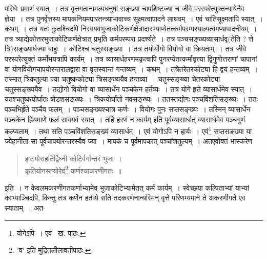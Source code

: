 \documentclass[11pt, openany]{book}
\begin{document}
\noindent परिधेः प्रमाणं स्यात्~। तत्र वृत्तगतानामल्पधनुषां सङ्ख्या चापशिष्टज्या च {\qt जीवे परस्परे}त्युक्तन्यायेनैव ज्ञेया~। तत्र पुनर्वृत्तस्य मापकनियमपारतन्त्र्याभावाच्च सूक्ष्मत्वापादने लाघवम्~। एवं चातिसूक्ष्मतापि स्यात्~। कथम्~। तत्र यतः कुतश्चिदपि
निरवयवभुजाकोटिकर्णक्षेत्रादारभ्याप्येतत्कर्मपरम्परयाल्पत्वमप्यापादनीयम्~। तत्र त्र्याद्येकोत्तरभुजाकोटिकर्णक्षेत्रात् प्रभृति कर्मपरम्परा प्रदर्श्यते~। तत्र पञ्चसङ्ख्यव्यासार्धवृ(तेति ? त्ते त्रि)सङ्ख्यार्धज्या बाहुः~। कोटिश्च चतुस्सङ्ख्या~। तत्र तयोर्योगो वियोगो वा क्रियताम्~। तत्र {\qt जीवे परस्परे}त्युक्तं कर्मोभयत्रापि कार्यम्~। तत्र व्यासार्धहरणमकृत्वापि पुनरप्येतत्कर्मावृत्त्या द्विगुणोत्तराणां चापानां वा योगवियोगचापयोरन्तरालद्वारा वा वृत्तस्यान्तं गन्तव्यम्~। कथम्~। तत्रेतरेतरकोट्या हि द्वयं हन्तव्यम्~। तस्मात् त्रिकतुल्या ज्या चतुष्ककोट्या त्रिसङ्ख्ययैव हन्तव्या~।
चतुस्सङ्ख्या चेतरकोट्या चतुस्सङ्ख्ययैव~। तद्योगो वियोगो वा व्यासार्धेन पञ्चकेन हर्तव्यः~। तत्र योगे हृते व्यासार्धमेव स्यात्~।
यतश्चतुष्कयोर्घातः षोडशसङ्ख्यः~। त्रिकयोर्घातो नवसङ्ख्यः~। ततस्तद्योगः पञ्चविंशतिसङ्ख्यः~। ततः पञ्चभिर्हृते पञ्चैव फलम्~। पञ्चसङ्ख्यश्चात्र कर्णः~। वियोगः पुनः सप्तसङ्ख्यः~। तस्मिन् व्यासार्धेन पञ्चकेन ह्रियमाणे फलं सावयवं स्यात्~। तर्हि हरणं न कार्यम् इति पूर्वव्यासार्धात् व्यासार्धमेव पञ्चगुणं कल्प्यताम्~। तथा सति पञ्चविंशतिसङ्ख्यं व्यासार्धम्~। एवं योगोऽपि न हार्यः~। एवं\renewcommand{\thefootnote}{२}\footnote{योगेऽपि~। एवं \textendash\ ख. पाठः.} सप्तसङ्ख्या या ज्येहानीता सा पूर्वचापयोरन्तरस्यैव ज्या~। मापकं च पूर्वमापकात् पञ्चांशतुल्यम्~। अतएवोक्तं भास्करेण\textendash

\begin{quote}
{\qt इष्टयोराहतिर्द्विघ्नी कोटिर्वर्गान्तरं भुजः~।\\
कृतियोगस्तयोरेवं}\renewcommand{\thefootnote}{*}\footnote{'व' इति मुद्रितलीलावतीपाठः.} {\qt कर्णश्चाकरणीगतः~॥}
\end{quote}

\noindent इति~। न केवलमकरणीगतकर्णाभ्यामेव भुजाकोटिभ्यामेतत् कर्म कार्यम्~। स्वेच्छया कल्पिताभ्यां याभ्यां काभ्याञ्चिदपि, किन्तु तत्र कर्णेन हर्तव्ये सति तदकरणेनान्यस्मिन् वृत्ते परिणम्यमाने ते अकरणीगते एव स्याताम्~। अत- 

\newpage
\end{document}

